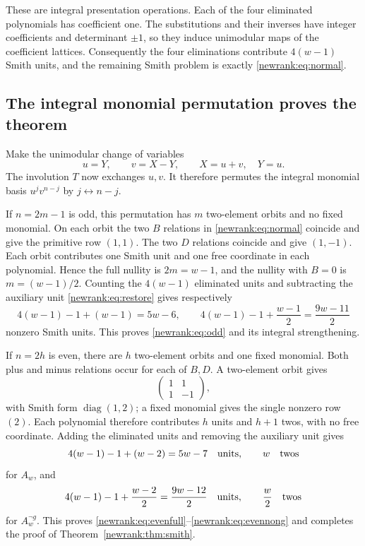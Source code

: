 These are integral presentation operations.  Each of the four eliminated
polynomials has coefficient one.  The substitutions and their inverses
have integer coefficients and determinant $\pm1$, so they induce
unimodular maps of the coefficient lattices.  Consequently the four
eliminations contribute $4(w-1)$ Smith units, and the remaining Smith
problem is exactly \eqref{newrank:eq:normal}.

\subsection{The integral monomial permutation proves the theorem}

Make the unimodular change of variables
\begin{equation}\label{newrank:eq:uv}
 u=Y,\qquad v=X-Y,\qquad X=u+v,\quad Y=u.
\end{equation}
The involution $T$ now exchanges $u,v$.  It therefore permutes the
integral monomial basis $u^jv^{n-j}$ by $j\leftrightarrow n-j$.

If $n=2m-1$ is odd, this permutation has $m$ two-element orbits and no
fixed monomial.  On each orbit the two $B$ relations in
\eqref{newrank:eq:normal} coincide and give the primitive row $(1,1)$.
The two $D$ relations coincide and give $(1,-1)$.  Each orbit contributes
one Smith unit and one free coordinate in each polynomial.  Hence the
full nullity is $2m=w-1$, and the nullity with $B=0$ is $m=(w-1)/2$.
Counting the $4(w-1)$ eliminated units and subtracting the auxiliary
unit \eqref{newrank:eq:restore} gives respectively
\[
 4(w-1)-1+(w-1)=5w-6,
 \qquad
 4(w-1)-1+\frac{w-1}{2}=\frac{9w-11}{2}
\]
nonzero Smith units.  This proves \eqref{newrank:eq:odd} and its
integral strengthening.

If $n=2h$ is even, there are $h$ two-element orbits and one fixed
monomial.  Both plus and minus relations occur for each of $B,D$.
A two-element orbit gives
\[
 \begin{pmatrix}1&1\\1&-1\end{pmatrix},
\]
with Smith form $\operatorname{diag}(1,2)$; a fixed monomial gives the
single nonzero row $(2)$.  Each polynomial therefore contributes $h$
units and $h+1$ twos, with no free coordinate.  Adding the eliminated
units and removing the auxiliary unit gives
\[
 4(w-1)-1+(w-2)=5w-7\quad\hbox{units},\qquad w\quad\hbox{twos}
\]
for $A_w$, and
\[
 4(w-1)-1+\frac{w-2}{2}=\frac{9w-12}{2}\quad\hbox{units},
 \qquad\frac w2\quad\hbox{twos}
\]
for $A_w^{\neg g}$.  This proves
\eqref{newrank:eq:evenfull}--\eqref{newrank:eq:evennong} and completes
the proof of Theorem~\ref{newrank:thm:smith}.

